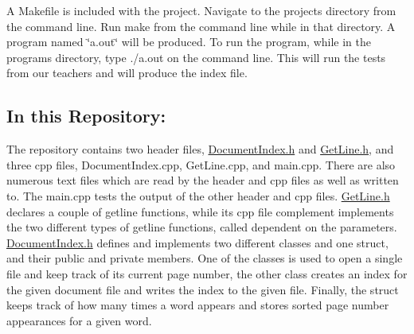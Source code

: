 A Makefile is included with the project. Navigate to the project\textquotesingle{}s directory from the command line. Run {\ttfamily make} from the command line while in that directory. A program named \char`\"{}a.\+out\char`\"{} will be produced. To run the program, while in the program\textquotesingle{}s directory, type {\ttfamily ./a.out} on the command line. This will run the tests from our teachers and will produce the index file.

\subsection*{In this Repository\+:}

The repository contains two header files, \hyperlink{DocumentIndex_8h_source}{Document\+Index.\+h} and \hyperlink{GetLine_8h_source}{Get\+Line.\+h}, and three cpp files, Document\+Index.\+cpp, Get\+Line.\+cpp, and main.\+cpp. There are also numerous text files which are read by the header and cpp files as well as written to. The main.\+cpp tests the output of the other header and cpp files. \hyperlink{GetLine_8h_source}{Get\+Line.\+h} declares a couple of getline functions, while it\textquotesingle{}s cpp file complement implements the two different types of getline functions, called dependent on the parameters. \hyperlink{DocumentIndex_8h_source}{Document\+Index.\+h} defines and implements two different classes and one struct, and their public and private members. One of the classes is used to open a single file and keep track of it\textquotesingle{}s current page number, the other class creates an index for the given document file and writes the index to the given file. Finally, the struct keeps track of how many times a word appears and stores sorted page number appearances for a given word. 